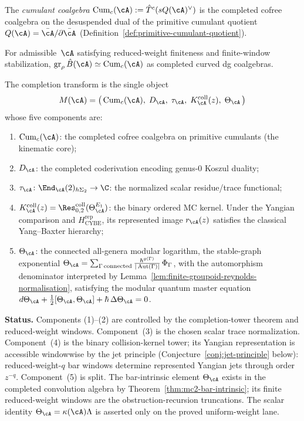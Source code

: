 The \emph{cumulant coalgebra}\label{def:cumulant-coalgebra}
$\operatorname{Cum}_c(\cA) := \hat{T}^c(sQ(\cA)^\vee)$ is the
completed cofree coalgebra on the desuspended dual of the primitive
cumulant quotient $Q(\cA) = \bar{\cA}/\partial\bar{\cA}$
(Definition~\ref{def:primitive-cumulant-quotient}).

\begin{conjecture}
\label{conj:cumulant-recognition}
For admissible~$\cA$ satisfying reduced-weight finiteness and
finite-window stabilization,
$\operatorname{gr}_\rho \hat{B}(\cA) \simeq
\operatorname{Cum}_c(\cA)$
as completed curved dg coalgebras.
\end{conjecture}

The completion transform is the single object
\begin{equation}\label{eq:modular-cumulant-transform}
M(\cA) = \bigl(\,
 \operatorname{Cum}_c(\cA),\;
 D_\cA,\;
 \tau_\cA,\;
 K_\cA^{\mathrm{coll}}(z),\;
 \Theta_\cA
\,\bigr)
\end{equation}
whose five components are:
\begin{enumerate}
\item $\operatorname{Cum}_c(\cA)$: the completed cofree coalgebra on
 primitive cumulants (the kinematic core);
\item $D_\cA$: the completed coderivation encoding genus-$0$ Koszul
 duality;
\item $\tau_\cA\colon\End_\cA(2)_{h\Sigma_2}\to\C$: the normalized
 scalar residue/trace functional;
\item
 $K_\cA^{\mathrm{coll}}(z)
 =\Res^{\mathrm{coll}}_{0,2}(\Theta_\cA^{E_1})$: the binary ordered
 MC kernel.  Under the Yangian comparison and
 $H_{\mathrm{CYBE}}^{\mathrm{rep}}$, its represented image
 $r_\cA(z)$ satisfies the classical Yang--Baxter hierarchy;
\item $\Theta_\cA$: the connected all-genera modular logarithm,
 the stable-graph exponential
 $\Theta_\cA = \sum_{\Gamma\,\text{connected}} \frac{\hbar^{g(\Gamma)}}{|\operatorname{Aut}(\Gamma)|}\,\Phi_\Gamma$,
 with the automorphism denominator interpreted by
 Lemma~\ref{lem:finite-groupoid-reynolds-normalisation},
 satisfying the modular quantum master equation
 $d\Theta_\cA + \tfrac{1}{2}[\Theta_\cA,\Theta_\cA] + \hbar\,\Delta\Theta_\cA = 0$.
\end{enumerate}

\noindent
\textbf{Status.} Components (1)--(2) are controlled by the
completion-tower theorem and reduced-weight windows. Component~(3)
is the chosen scalar trace normalization.  Component~(4) is the
binary collision-kernel tower; its Yangian representation is
accessible windowwise by the jet principle
(Conjecture~\ref{conj:jet-principle} below): reduced-weight-$q$ bar
windows determine represented Yangian jets through order~$z^{-q}$.
Component~(5) is split. The bar-intrinsic element
$\Theta_\cA$ exists in the completed convolution algebra by
Theorem~\ref{thm:mc2-bar-intrinsic}; its finite reduced-weight
windows are the obstruction-recursion truncations. The scalar identity
$\Theta_\cA=\kappa(\cA)\Lambda$ is asserted only on the proved
uniform-weight lane.

